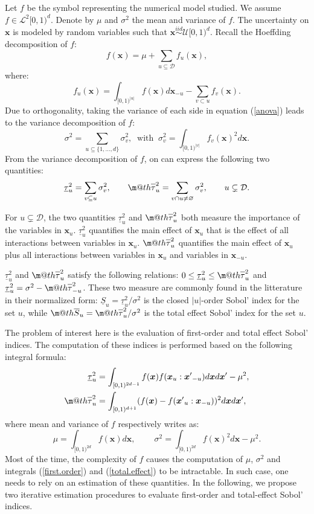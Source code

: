 \documentclass[]{elsarticle}
\makeatletter
\theoremstyle{definition}
\newcommand{\bvec}[1]{\boldsymbol{#1}}
\newcommand{\vx}{\bvec{x}}
\newcommand\iid{\stackrel{iid}{\sim}}
\newcommand*{\ov}[1]{
  \m@th\overline{\mbox{#1}\raisebox{2mm}{}}
}
\makeatother
\begin{document}
Let $f$ be the symbol representing the numerical model studied. We assume $f \in \mathcal{L}^2[0,1)^d$. Denote by $\mu$ and $\sigma^2$ the mean and variance of $f$.
The uncertainty on $\vx$ is modeled by random variables such that $\vx \iid \mathcal{U}[0,1)^d$. Recall the Hoeffding decomposition \cite{Hoeffding} of $f$:
\begin{equation}
f(\vx)=\mu+\sum \limits_{u \subseteq \mathcal{D}} f_u(\vx),
\label{anova}
\end{equation}
where:
\[f_u(\vx)= \int_{[0,1)^{|u|}} f(\vx) d{\vx}_{-u} - \sum \limits_{v \subset u} f_v(\vx).\]
Due to orthogonality, taking the variance of each side in equation (\ref{anova}) leads to the variance decomposition of $f$:
\[ \sigma^2 = \sum \limits_{u \subseteq \{1,\dots,d\}} \sigma_v^2, \ \text{ with } \ \sigma_v^2=\int_{[0,1)^{|v|}} f_v(\vx)^2 d{\vx}.\]
From the variance decomposition of $f$, on can express the following two quantities:
\[\underline{\tau}_u^2 = \sum \limits_{v \subseteq u} \sigma_v^2, \qquad
\ov{$\tau$}_u^2 = \sum \limits_{v \cap u \neq \varnothing} \sigma_v^2, \qquad u \subsetneq \mathcal{D}.\]

For $u \subsetneq \mathcal{D}$, the two quantities $\underline{\tau}_u^2$ and $\ov{$\tau$}_u^2$ both measure the importance of the variables in $\vx_u$. $\underline{\tau}_u^2$ quantifies the main effect of $\vx_u$ that is the effect of all interactions between variables in $\vx_u$. $\ov{$\tau$}_u^2$ quantifies the main effect of $\vx_u$ plus all interactions between variables in $\vx_u$ and variables in $\vx_{-u}$.

$\underline{\tau}_u^2$ and $\ov{$\tau$}_u^2$ satisfy the following relations: $ 0 \leq  \underline{\tau}_u^2 \leq \ov{$\tau$}_u^2$ and $\underline{\tau}_u^2 = \sigma^2 - \ov{$\tau$}_{-u}^2$. These two measure are commonly found in the litterature in their normalized form: $\underline{S}_u = \underline{\tau}_u^2 / \sigma^2$ is the closed $|u|$-order Sobol' index for the set $u$, while $\ov{$S$}_u = \ov{$\tau$}_u^2 / \sigma^2$ is the total effect Sobol' index for the set $u$.
\bigskip

The problem of interest here is the evaluation of first-order and total effect Sobol' indices. The computation of these indices is performed based on the following integral formula:
\begin{align}
\label{first.order}
\underline{\tau}_u^2  &= \int_{[0,1)^{2d-1}} f(\vx) f(\vx_u:{\vx'}_{-u})d\vx d{\vx'}-\mu^2 , \\
\label{total.effect}
\ov{$\tau$}_u^2 &= \int_{[0,1)^{d+1}}(f(\vx)-f({\vx'}_u:\vx_{-u}))^2d\vx d{\vx'},
\end{align}
where mean and variance of $f$ respectively writes as:
\[ \mu = \int_{[0,1)^{2d}} f(\vx) d{\vx}, \ \qquad
\sigma^2 = \int_{[0,1)^{2d}} f(\vx)^2d{\vx} - \mu^2 .\]
Most of the time, the complexity of $f$ causes the computation of $\mu$, $\sigma^2$ and integrals (\ref{first.order}) and (\ref{total.effect}) to be intractable. In such case, one needs to rely on an estimation of these quantities. In the following, we propose two iterative estimation procedures to evaluate first-order and total-effect Sobol' indices.
\end{document}
